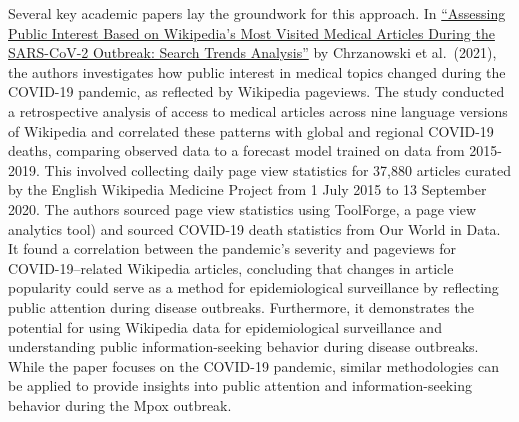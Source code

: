 \documentclass[
  12pt,
]{article}
\begin{document}
Several key academic papers lay the groundwork for this approach. In
\href{https://doi.org/10.2196/26331}{``Assessing Public Interest Based
on Wikipedia's Most Visited Medical Articles During the SARS-CoV-2
Outbreak: Search Trends Analysis''} by Chrzanowski et al.~(2021), the
authors investigates how public interest in medical topics changed
during the COVID-19 pandemic, as reflected by Wikipedia pageviews. The
study conducted a retrospective analysis of access to medical articles
across nine language versions of Wikipedia and correlated these patterns
with global and regional COVID-19 deaths, comparing observed data to a
forecast model trained on data from 2015-2019. This involved collecting
daily page view statistics for 37,880 articles curated by the English
Wikipedia Medicine Project from 1 July 2015 to 13 September 2020. The
authors sourced page view statistics using ToolForge, a page view
analytics tool) and sourced COVID-19 death statistics from Our World in
Data. It found a correlation between the pandemic's severity and
pageviews for COVID-19--related Wikipedia articles, concluding that
changes in article popularity could serve as a method for
epidemiological surveillance by reflecting public attention during
disease outbreaks. Furthermore, it demonstrates the potential for using
Wikipedia data for epidemiological surveillance and understanding public
information-seeking behavior during disease outbreaks. While the paper
focuses on the COVID-19 pandemic, similar methodologies can be applied
to provide insights into public attention and information-seeking
behavior during the Mpox outbreak.
\end{document}
